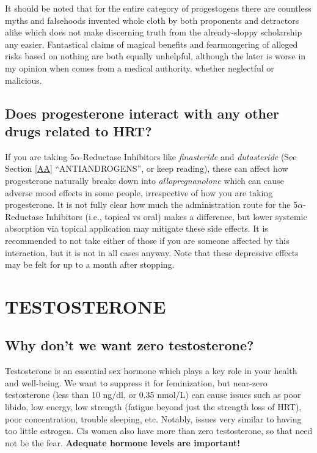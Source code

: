 \documentclass{article}
\begin{document}
{{It should be noted that for the entire category of progestogens there are countless myths and falsehoods invented whole cloth by both proponents and detractors alike which does not make discerning truth from the already-sloppy scholarship any easier. Fantastical claims of magical benefits and fearmongering of alleged risks based on nothing are both equally unhelpful, although the later is worse in my opinion when comes from a medical authority, whether neglectful or malicious.

\subsection{Does progesterone interact with any other drugs related to HRT?}\label{8-18}

If you are taking 5$\alpha$-Reductase Inhibitors like \textit{finasteride} and \textit{dutasteride} (See Section \ref{AA} “ANTIANDROGENS”, or keep reading), these can affect how progesterone naturally breaks down into \textit{allopregnanolone} which can cause adverse mood effects in some people, irrespective of how you are taking progesterone. It is not fully clear how much the administration route for the 5$\alpha$-Reductase Inhibitors (i.e., topical vs oral) makes a difference, but lower systemic absorption via topical application may mitigate these side effects. It is recommended to not take either of those if you are someone affected by this interaction, but it is not in all cases anyway. Note that these depressive effects may be felt for up to a month after stopping. 
 

\section{TESTOSTERONE}\label{T}

\subsection{Why don’t we want zero testosterone?}

Testosterone is an essential sex hormone which plays a key role in your health and well-being. We want to suppress it for feminization, but near-zero testosterone (less than 10 ng/dl, or 0.35 nmol/L) can cause issues such as poor libido, low energy, low strength (fatigue beyond just the strength loss of HRT), poor concentration, trouble sleeping, etc. Notably, issues very similar to having too little estrogen. Cis women also have more than zero testosterone, so that need not be the fear. \textbf{Adequate hormone levels are important!}

}}
\end{document}
